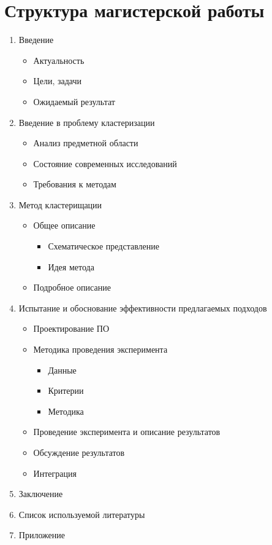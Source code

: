 \chapter{Структура магистерской работы}
\begin{enumerate}\itemsep-5pt
    \item Введение
    \vspace*{-1em}
    \begin{itemize}\itemsep-5pt
        \item Актуальность
        \item Цели, задачи
        \item Ожидаемый результат
    \end{itemize}
    \item Введение в проблему кластеризации
    \vspace*{-1em}
    \begin{itemize}\itemsep-5pt\itemsep-5pt
        \item Анализ предметной области
        \item Состояние современных исследований
        \item Требования к методам
    \end{itemize}
    \item Метод кластерищации
    \vspace*{-1em}
    \begin{itemize}\itemsep-5pt
        \item Общее описание
        \begin{itemize}\itemsep-5pt
            \item Схематическое представление
            \item Идея метода
        \end{itemize}
        \item Подробное описание
    \end{itemize}
    \item Испытание и обоснование эффективности предлагаемых подходов
    \vspace*{-1em}
    \begin{itemize}\itemsep-5pt
        \item Проектирование ПО
        \item Методика проведения эксперимента
        \vspace*{-1em}
        \begin{itemize}\itemsep-5pt
            \item Данные
            \item Критерии
            \item Методика
        \end{itemize}
        \item Проведение эксперимента и описание результатов
        \item Обсуждение результатов
        \item Интеграция
    \end{itemize}
    \item Заключение
    \item Список используемой литературы
    \item Приложение
\end{enumerate}

